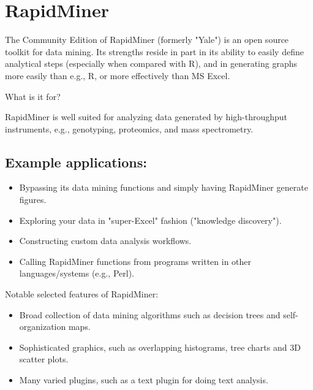 \section{RapidMiner}

The Community Edition of RapidMiner (formerly "Yale") is an open source toolkit for data mining. Its strengths reside in part in its ability to easily define analytical steps (especially when compared with R), and in generating graphs more easily than e.g., R, or more effectively than MS Excel. 


What is it for?

RapidMiner is well suited for analyzing data generated by high-throughput instruments, e.g., genotyping, proteomics, and mass spectrometry. 


\subsection{Example applications:}

\begin{itemize}
\item Bypassing its data mining functions and simply having RapidMiner generate figures.
\item Exploring your data in "super-Excel" fashion ("knowledge discovery").
\item Constructing custom data analysis workflows.
\item Calling RapidMiner functions from programs written in other languages/systems (e.g., Perl).
\end{itemize}

Notable selected features of RapidMiner:

\begin{itemize}
\item Broad collection of data mining algorithms such as decision trees and self-organization maps.
\item Sophisticated graphics, such as overlapping histograms, tree charts and 3D scatter plots.
\item Many varied plugins, such as a text plugin for doing text analysis.
\end{itemize}
